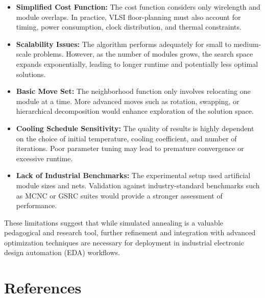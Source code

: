 \documentclass[9pt,a4paper,twoside]{rho-class/rho}
\begin{document}
\begin{itemize}
    \item \textbf{Simplified Cost Function:} The cost function considers only wirelength and module overlaps. In practice, VLSI floor-planning must also account for timing, power consumption, clock distribution, and thermal constraints.
    
    \item \textbf{Scalability Issues:} The algorithm performs adequately for small to medium-scale problems. However, as the number of modules grows, the search space expands exponentially, leading to longer runtime and potentially less optimal solutions.
    
    \item \textbf{Basic Move Set:} The neighborhood function only involves relocating one module at a time. More advanced moves such as rotation, swapping, or hierarchical decomposition would enhance exploration of the solution space.
    
    \item \textbf{Cooling Schedule Sensitivity:} The quality of results is highly dependent on the choice of initial temperature, cooling coefficient, and number of iterations. Poor parameter tuning may lead to premature convergence or excessive runtime.
    
    \item \textbf{Lack of Industrial Benchmarks:} The experimental setup used artificial module sizes and nets. Validation against industry-standard benchmarks such as MCNC or GSRC suites would provide a stronger assessment of performance.
\end{itemize}

These limitations suggest that while simulated annealing is a valuable pedagogical and research tool, further refinement and integration with advanced optimization techniques are necessary for deployment in industrial electronic design automation (EDA) workflows.

\section*{References}
\end{document}
